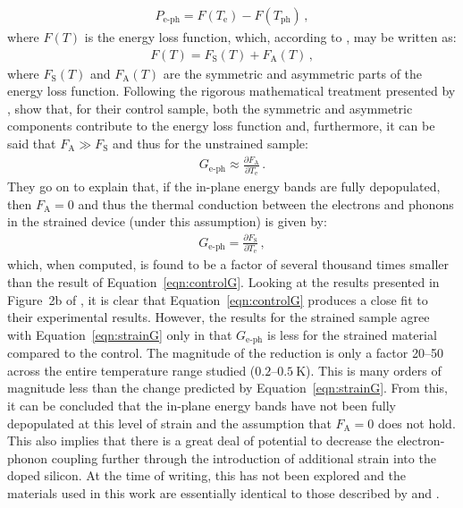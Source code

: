 \begin{align}
P_{\mathrm{e\mbox{-}ph}} = F\left(T_{\mathrm{e}}\right) 
	- F\left(T_{\mathrm{ph}}\right)\,, \label{eqn:ephPowerLoss}
\end{align}
where $F\left(T\right)$ is the energy loss function, which, according to \textcite{Prunnila2007}, may be written as:
\begin{align}
F\left(T\right) = F_{\mathrm{S}}\left(T\right) + F_{\mathrm{A}}\left(T\right)\,,
\end{align}
where $F_{\mathrm{S}}\left(T\right)$ and $F_{\mathrm{A}}\left(T\right)$ are the symmetric and asymmetric parts of the energy loss function. Following the rigorous mathematical treatment presented by \textcite{Prunnila2007}, \citeauthor{Muhonen2011} show that, for their control sample, both the symmetric and asymmetric components contribute to the energy loss function and, furthermore, it can be said that $F_{\mathrm{A}} \gg F_{\mathrm{S}}$ and thus for the unstrained sample:
\begin{align}
G_{\mathrm{e\mbox{-}ph}} \approx
	\frac{\partial F_{\mathrm{A}}}{\partial T_{\mathrm{e}}}\,.
\label{eqn:controlG}
\end{align}
They go on to explain that, if the in-plane energy bands are fully depopulated, then $F_{\mathrm{A}} = 0$ and thus the thermal conduction between the electrons and phonons in the strained device (under this assumption) is given by:
\begin{align}
G_{\mathrm{e\mbox{-}ph}} = 
	\frac{\partial F_{\mathrm{S}}}{\partial T_{\mathrm{e}}}\,,
\label{eqn:strainG}
\end{align}
which, when computed, is found to be a factor of several thousand times smaller than the result of Equation~\ref{eqn:controlG}. Looking at the results presented in Figure~2b of \textcite{Muhonen2011}, it is clear that Equation~\ref{eqn:controlG} produces a close fit to their experimental results. However, the results for the strained sample agree with Equation~\ref{eqn:strainG} only in that $G_{\mathrm{e\mbox{-}ph}}$ is less for the strained material compared to the control. The magnitude of the reduction is only a factor 20--50 across the entire temperature range studied ($0.2\mbox{--}0.5~\mathrm{K}$). This is many orders of magnitude less than the change predicted by Equation~\ref{eqn:strainG}. From this, it can be concluded that the in-plane energy bands have not been fully depopulated at this level of strain and the assumption that $F_{\mathrm{A}} = 0$ does not hold. This also implies that there is a great deal of potential to decrease the electron-phonon coupling further through the introduction of additional strain into the doped silicon. At the time of writing, this has not been explored and the materials used in this work are essentially identical to those described by \textcite{Muhonen2011} and \textcite{Prest2011}.
%
